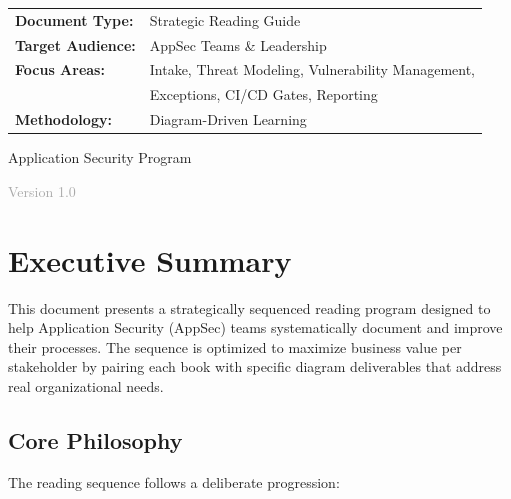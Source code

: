 \documentclass[11pt,letterpaper]{article}
\begin{document}
\begin{titlepage}
    \vspace{1.5cm}

    \begin{tabular}{ll}
        \textbf{Document Type:} & Strategic Reading Guide \\[0.3cm]
        \textbf{Target Audience:} & AppSec Teams \& Leadership \\[0.3cm]
        \textbf{Focus Areas:} & Intake, Threat Modeling, Vulnerability Management, \\
        & Exceptions, CI/CD Gates, Reporting \\[0.3cm]
        \textbf{Methodology:} & Diagram-Driven Learning \\
    \end{tabular}

    \vfill

    {\large Application Security Program\par}

    \vspace{0.5cm}

    {\small\textcolor{darkgray}{Version 1.0}\par}

\end{titlepage}\hypersetup{pageanchor=true}

\tableofcontents
\newpage

\section{Executive Summary}

This document presents a strategically sequenced reading program designed to help Application Security (AppSec) teams systematically document and improve their processes. The sequence is optimized to maximize business value per stakeholder by pairing each book with specific diagram deliverables that address real organizational needs.

\subsection{Core Philosophy}

The reading sequence follows a deliberate progression:
\end{document}
